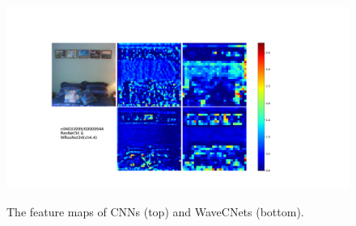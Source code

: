 \begin{figure}[!bpt]
	{\includegraphics*[scale=0.25, viewport=175 65 1025 575]{figures/feature_map_clean/00009944_WResNet34.pdf}}\hspace{30pt}
	\caption{The feature maps of CNNs (top) and WaveCNets (bottom).}
	\label{fig_feature_maps_more_0}
\end{figure}
